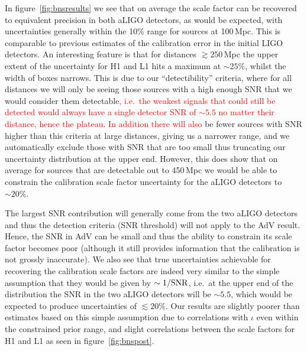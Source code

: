 \documentclass[prd, twocolumn, lengthcheck, superscriptaddress, showpacs, letterpaper, nofootinbib]{revtex4-1}
\newcommand{\refresp}[1]{\textcolor{red}{#1}}
\begin{document}
In figure~\ref{fig:bnsresults} we see that on average the scale factor can be
recovered to equivalent precision in both \ac{aLIGO} detectors, as would be
expected, with uncertainties generally within the 10\% range for sources at
100\,Mpc. This is comparable to previous estimates of the calibration error in
the initial LIGO detectors. An interesting feature is that for distances
$\gtrsim 250$\,Mpc the upper extent of the uncertainty for H1 and L1 hits a
maximum at $\sim 25\%$, whilst the width of boxes narrows. This is due to our
``detectibility'' criteria, where for all distances we will only be seeing
those sources with a high enough \ac{SNR} that we would consider them
detectable\refresp{, i.e.\ the weakest signals that could still be detected would
always have a single detector \ac{SNR} of $\sim 5.5$ no matter their distance, hence the
plateau}. \refresp{In addition there will also} be fewer sources with \ac{SNR} higher than
this criteria at large distances, giving us a narrower range, and we
automatically exclude those with \ac{SNR} that are too small thus truncating
our uncertainty distribution at the upper end.  However, this does show that on
average for sources that are detectable out to 450\,Mpc we would be able to
constrain the calibration scale factor uncertainty for the \ac{aLIGO} detectors
to $\sim 20\%$. 

The largest \ac{SNR} contribution will generally come from the two
\ac{aLIGO} detectors and thus the detection criteria (\ac{SNR} threshold) will
not apply to the \ac{AdV} result. Hence, the \ac{SNR} in \ac{AdV} can be small
and thus the ability to constrain its scale factor becomes poor (although it
still provides information that the calibration is not grossly inaccurate). We
also see that true uncertainties achievable for recovering the calibration
scale factors are indeed very similar to the simple assumption that they would
be given by $\sim 1/{\rm SNR}$, i.e.\ at the upper end of the distribution the
\ac{SNR} in the two \ac{aLIGO} detectors will be $\sim 5.5$, which would be
expected to produce uncertainties of $\lesssim 20\%$. Our results are slightly
poorer than estimates based on this simple assumption due to correlations with
$\iota$ even within the constrained prior range, and slight correlations
between the scale factors for H1 and L1 as seen in figure~\ref{fig:bnspost}.
\end{document}
